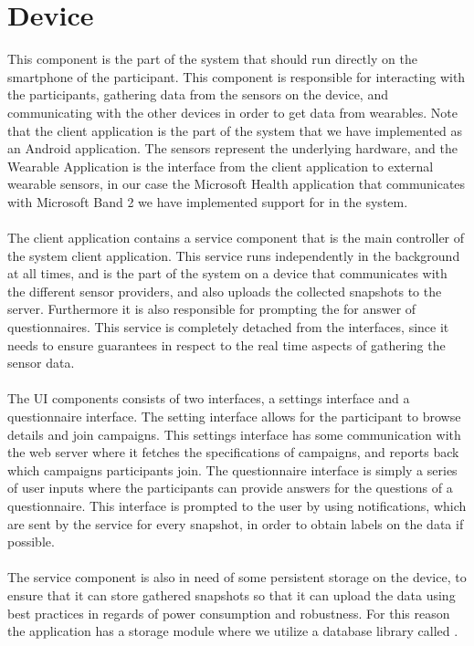 \section{Device}
\label{sec:device}
This component is the part of the system that should run directly on the smartphone of the participant. This component is responsible for interacting with the participants, gathering data from the sensors on the device, and communicating with the other devices in order to get data from wearables. Note that the client application is the part of the system that we have implemented as an Android application. The sensors represent the underlying hardware, and the Wearable Application is the interface from the client application to external wearable sensors, in our case the Microsoft Health application that communicates with Microsoft Band 2 we have implemented support for in the system.
\\\\
The client application contains a service component that is the main controller of the system client application. This service runs independently in the background at all times, and is the part of the system on a device that communicates with the different sensor providers, and also uploads the collected snapshots to the server. Furthermore it is also responsible for prompting the for answer of questionnaires. This service is completely detached from the interfaces, since it needs to ensure guarantees in respect to the real time aspects of gathering the sensor data.
\\\\
The UI components consists of two interfaces, a settings interface and a questionnaire interface. The setting interface allows for the participant to browse details and join campaigns. This settings interface has some communication with the web server where it fetches the specifications of campaigns, and reports back which campaigns participants join. The questionnaire interface is simply a series of user inputs where the participants can provide answers for the questions of a questionnaire. This interface is prompted to the user by using notifications, which are sent by the service for every snapshot, in order to obtain labels on the data if possible.
\\\\
The service component is also in need of some persistent storage on the device, to ensure that it can store gathered snapshots so that it can upload the data using best practices in regards of power consumption and robustness. For this reason the application has a storage module where we utilize a database library called .
